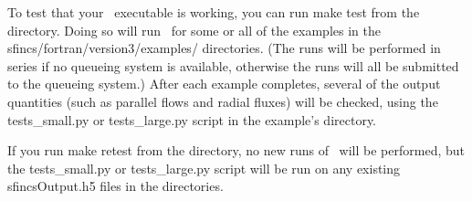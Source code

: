 To test that your \sfincs~executable is working, you can run {\ttfamily make test}
from the  directory.  Doing so will run
\sfincs~for some or all of the examples in the {\ttfamily sfincs/fortran/version3/examples/} directories.
(The runs will be performed in series if no queueing system is available, otherwise the runs will all
be submitted to the queueing system.)
After each example completes, several of the output quantities (such as parallel flows and radial fluxes)
will be checked, using the
{\ttfamily tests\_small.py} or {\ttfamily tests\_large.py} script in the example's directory.

If you run {\ttfamily make retest} from the  directory,
no new runs of \sfincs~will be performed, but the {\ttfamily tests\_small.py} or {\ttfamily tests\_large.py} script
will be run on any existing {\ttfamily sfincsOutput.h5} files in the  directories.
